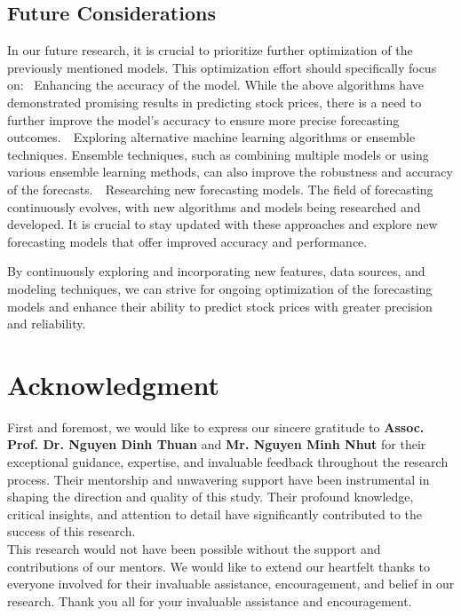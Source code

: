 \documentclass{ieeeojies}
\begin{document}
\subsection{Future Considerations}
In our future research, it is crucial to prioritize further optimization of the previously mentioned models. This optimization effort should specifically focus on:
\indent\textbullet\ Enhancing the accuracy of the model. While the above algorithms have demonstrated promising results in predicting stock prices, there is a need to further improve the model's accuracy to ensure more precise forecasting outcomes.\
\indent\textbullet\ Exploring alternative machine learning algorithms or ensemble techniques. Ensemble techniques, such as combining multiple models or using various ensemble learning methods, can also improve the robustness and accuracy of the forecasts.\
\indent\textbullet\ Researching new forecasting models. The field of forecasting continuously evolves, with new algorithms and models being researched and developed. It is crucial to stay updated with these approaches and explore new forecasting models that offer improved accuracy and performance.\

By continuously exploring and incorporating new features, data sources, and modeling techniques, we can strive for ongoing optimization of the forecasting models and enhance their ability to predict stock prices with greater precision and reliability.
\section*{Acknowledgment}
\addcontentsline{toc}{section}{Acknowledgment}
First and foremost, we would like to express our sincere gratitude to \textbf{Assoc. Prof. Dr. Nguyen Dinh Thuan} and \textbf{Mr. Nguyen Minh Nhut} for their exceptional guidance, expertise, and invaluable feedback throughout the research process. Their mentorship and unwavering support have been instrumental in shaping the direction and quality of this study. Their profound knowledge, critical insights, and attention to detail have significantly contributed to the success of this research.
\\This research would not have been possible without the support and contributions of our mentors. We would like to extend our heartfelt thanks to everyone involved for their invaluable assistance, encouragement, and belief in our research. Thank you all for your invaluable assistance and encouragement.
\end{document}
